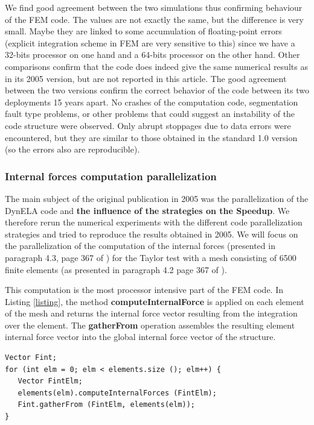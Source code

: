 We find good agreement between the two simulations thus confirming behaviour of the FEM code. The values are not exactly the same, but the difference is very small. Maybe they are linked to some accumulation of floating-point errors (explicit integration scheme in FEM are very sensitive to this) since we have a 32-bits processor on one hand and a 64-bits processor on the other hand. Other comparisons confirm that the code does indeed give the same numerical results as in its 2005 version, but are not reported in this article. The good agreement between the two versions confirm the correct behavior of the code between its two deployments 15 years apart. No crashes of the computation code, segmentation fault type problems, or other problems that could suggest an instability of the code structure were observed. Only abrupt stoppages due to data errors were encountered, but they are similar to those obtained in the standard 1.0 version (so the errors also are reproducible).

\subsubsection{Internal forces computation parallelization}

The main subject of the original publication in 2005 was the parallelization of the DynELA code and \textbf{the influence of the strategies on the Speedup}. We therefore rerun the numerical experiments with the different code parallelization strategies and tried to reproduce the results obtained in 2005. We will focus on the parallelization of the computation of the internal forces (presented in paragraph 4.3, page 367 of \cite{Pantale:2005}) for the Taylor test with a mesh consisting of 6500 finite elements (as presented in paragraph 4.2 page 367 of \cite{Pantale:2005}). 

This computation is the most processor intensive part of the FEM code. In Listing \ref{listing}, the method \textbf{computeInternalForce} is applied on each element of the mesh and returns the internal force vector resulting from the integration over the element. The \textbf{gatherFrom} operation assembles the resulting element internal force vector into the global internal force vector of the structure.

\begin{lstlisting}[label=listing,caption={Internal forces computation (standard version)},captionpos=b]
Vector Fint;
for (int elm = 0; elm < elements.size (); elm++) {
   Vector FintElm;
   elements(elm).computeInternalForces (FintElm);
   Fint.gatherFrom (FintElm, elements(elm));
}
\end{lstlisting}


